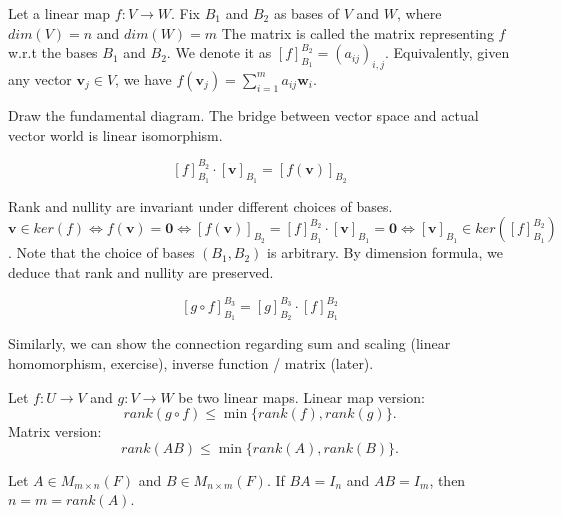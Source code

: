 \documentclass[12pt]{article}
\begin{document}
\begin{definition}
    Let a linear map $f:V\rightarrow W$. Fix $B_1$ and $B_2$ as bases of $V$ and $W$, where $dim(V)=n$ and $dim(W)=m$
    The matrix is called the matrix representing $f$ w.r.t the bases $B_1$ and $B_2$.
    We denote it as $[f]^{B_2}_{B_1}=(a_{ij})_{i,j}$. Equivalently, given any vector $\mathbf{v}_j\in V$, we have $f(\mathbf{v}_j)=\sum_{i=1}^{m}a_{ij}\mathbf{w}_i$.
\end{definition}

Draw the fundamental diagram. The bridge between vector space and actual vector world is linear isomorphism.

\begin{theorem}
    \[[f]^{B_2}_{B_1}\cdot [\mathbf{v}]_{B_1} = [f(\mathbf{v})]_{B_2}\]
\end{theorem}

\begin{corollary}
    Rank and nullity are invariant under different choices of bases.
    $\mathbf{v}\in ker(f) \Leftrightarrow f(\mathbf{v})=\mathbf{0} \Leftrightarrow [f(\mathbf{v})]_{B_2} = [f]^{B_2}_{B_1}\cdot [\mathbf{v}]_{B_1} = \mathbf{0} \Leftrightarrow [\mathbf{v}]_{B_1} \in ker([f]^{B_2}_{B_1})$.
    Note that the choice of bases $(B_1, B_2)$ is arbitrary. By dimension formula, we deduce that rank and nullity are preserved.
\end{corollary}



\begin{theorem}
    \[[g\circ f]^{B_3}_{B_1} =  [g]^{B_3}_{B_2} \cdot [f]^{B_2}_{B_1}\]
\end{theorem}

Similarly, we can show the connection regarding sum and scaling (linear homomorphism, exercise), inverse function / matrix (later).


\begin{theorem}
    Let $f:U\rightarrow V$ and $g:V\rightarrow W$ be two linear maps.
    Linear map version:
    \[rank(g\circ f)\leq \min\{rank(f), rank(g)\}.\]
    Matrix version:
    \[rank(AB)\leq \min\{rank(A), rank(B)\}.\]
\end{theorem}

\begin{theorem}
    Let $A\in M_{m\times n}(F)$ and $B\in M_{n\times m}(F)$.
    If $BA=I_n$ and $AB=I_m$, then $n=m=rank(A)$.
\end{theorem}
\end{document}
